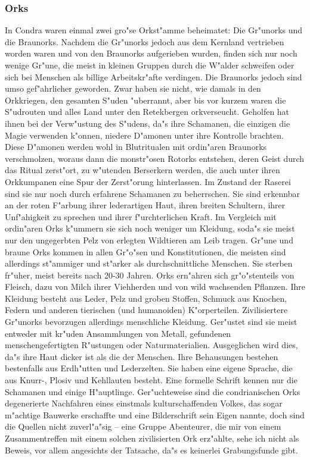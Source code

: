 \documentclass[a5paper,8pt]{book}
\begin{document}
\newpage

\subsubsection{Orks}

In Condra waren einmal zwei gro"se Orkst"amme beheimatet: Die Gr"unorks und die Braunorks.  Nachdem die Gr"unorks jedoch aus dem Kernland vertrieben worden waren und von den Braunorks 
aufgerieben wurden, finden sich nur noch wenige Gr"une, die meist in kleinen Gruppen durch die W"alder schweifen oder sich bei Menschen als billige Arbeitskr"afte verdingen. Die Braunorks jedoch sind umso gef"ahrlicher geworden. Zwar haben sie nicht, wie damals in den Orkkriegen, den gesamten S"uden "uberrannt, aber bis vor kurzem waren die S"udrouten und alles Land unter den Retekbergen orkverseucht. Geholfen hat ihnen bei der Verw"ustung des S"udens, da"s ihre Schamanen, die einzigen die Magie verwenden k"onnen, niedere D"amonen unter ihre Kontrolle brachten. Diese D"amonen werden wohl in Blutritualen mit ordin"aren Braunorks verschmolzen, woraus dann die monstr"osen Rotorks entstehen, deren Geist durch das Ritual zerst"ort, zu w"utenden Berserkern werden, die auch unter ihren Orkkumpanen eine Spur der Zerst"orung hinterlassen. Im Zustand der Raserei sind sie nur noch durch erfahrene Schamanen zu beherrschen. Sie sind erkennbar an der roten F"arbung ihrer lederartigen Haut, ihren breiten Schultern, ihrer 
Unf"ahigkeit zu sprechen und ihrer f"urchterlichen Kraft. Im Vergleich mit ordin"aren Orks k"ummern sie sich noch weniger um Kleidung, soda"s sie meist nur den ungegerbten Pelz von erlegten Wildtieren am Leib tragen. Gr"une und braune Orks kommen in allen Gr"o"sen und Konstitutionen, die meisten sind allerdings st"ammiger und st"arker als durchschnittliche Menschen. Sie sterben fr"uher, meist bereits nach 20-30 Jahren. Orks ern"ahren sich gr"o"stenteils von Fleisch, dazu von Milch ihrer Viehherden und von wild wachsenden Pflanzen. Ihre Kleidung besteht aus Leder, Pelz und groben Stoffen, Schmuck aus Knochen, Federn und anderen tierischen (und humanoiden) K"orperteilen. Zivilisiertere Gr"unorks bevorzugen allerdings menschliche Kleidung. Ger"ustet sind sie meist entweder mit kr"uden Ansammlungen von Metall, gefundenen menschengefertigten R"ustungen oder Naturmaterialien. Ausgeglichen wird dies, da"s ihre Haut dicker ist als die der Menschen. Ihre Behausungen bestehen bestenfalls aus Erdh"utten und Lederzelten.
 Sie haben eine eigene Sprache, die aus Knurr-, Plosiv und Kehllauten besteht. Eine formelle Schrift kennen nur die Schamanen und einige H"auptlinge. Ger"uchteweise sind die condrianischen Orks degenerierte Nachfahren eines einstmals kulturschaffenden Volkes, das sogar m"achtige Bauwerke erschaffte und eine Bilderschrift sein Eigen nannte, doch sind die Quellen nicht zuverl"a"sig – eine Gruppe Abenteurer, die mir von einem Zusammentreffen mit einem solchen zivilisierten Ork erz"ahlte, sehe ich nicht als Beweis, vor allem angesichts der Tatsache, da"s es keinerlei Grabungsfunde gibt. 
\end{document}
